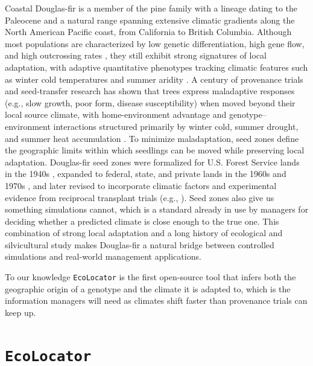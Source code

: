 \documentclass[]{article}
\newcommand{\dfir}{Douglas-fir\xspace}
\newcommand{\ecolocator}{\texttt{EcoLocator}\xspace}
\begin{document}
Coastal \dfir is a member of the pine family
with a lineage dating to the Paleocene \citep{hermann_genus_1985}
and a natural range spanning extensive climatic
gradients along the North American Pacific coast, from California
to British Columbia. Although most populations are characterized by
low genetic differentiation, high gene flow, and high outcrossing rates \citep{slavov_pollen_2005},
they still exhibit strong signatures of local adaptation,
with adaptive quantitative phenotypes tracking climatic features
such as winter cold temperatures and summer aridity \citep{stclair_genecology_2005}.
A century of provenance trials and seed-transfer research
has shown that trees express maladaptive responses
(e.g., slow growth, poor form, disease susceptibility)
when moved beyond their local source climate,
with home-environment advantage and genotype--environment interactions
structured primarily by winter cold, summer drought,
and summer heat accumulation
\citep{stclair_1912_2020, stclair_genecology_2005, stclair_genetic_2007}.
To minimize maladaptation, seed zones define the geographic limits
within which seedlings can be moved while preserving local adaptation.
\dfir seed zones were formalized for U.S. Forest Service lands
in the 1940s \citep{kummel_forest_1944},
expanded to federal, state, and private lands
in the 1960s and 1970s \citep{usdaforestservice_tree_1973},
and later revised to incorporate climatic factors
and experimental evidence from reciprocal transplant trials
(e.g., \citealp{randall_forest_1996, stclair_seedlot_2022}).
Seed zones also give us something simulations cannot,
which is a standard already in use by managers
for deciding whether a predicted climate is close enough to the true one.
This combination of strong local adaptation and a long history
of ecological and silvicultural study
makes \dfir a natural bridge
between controlled simulations and real-world management applications.


To our knowledge \ecolocator is the first open-source tool
that infers both the geographic origin of a genotype
and the climate it is adapted to,
which is the information managers will need
as climates shift faster than provenance trials can keep up.

\section{\ecolocator}
\end{document}
